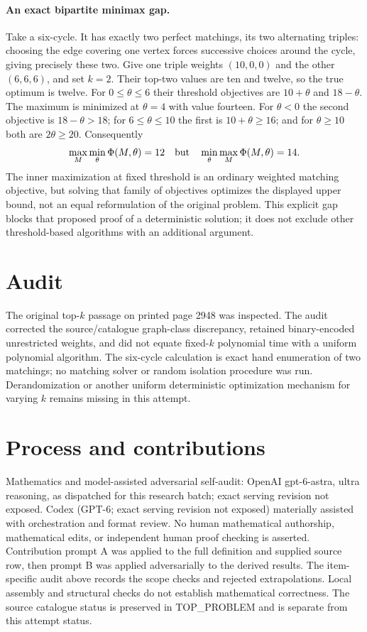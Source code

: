 \documentclass[11pt]{article}
\begin{document}
\paragraph{An exact bipartite minimax gap.}
Take a six-cycle. It has exactly two perfect matchings, its two
alternating triples: choosing the edge covering one vertex forces
successive choices around the cycle, giving precisely these two.
Give one triple weights $(10,0,0)$ and the other $(6,6,6)$,
and set $k=2$. Their top-two values are ten and twelve, so
the true optimum is twelve. For $0\le\theta\le6$ their
threshold objectives are $10+\theta$ and $18-\theta$.
The maximum is minimized at $\theta=4$ with value fourteen.
For $\theta<0$ the second objective is $18-\theta>18$;
for $6\le\theta\le10$ the first is $10+\theta\ge16$;
and for $\theta\ge10$ both are $2\theta\ge20$.
Consequently
\[
\max_M\min_\theta\Phi(M,\theta)=12
\quad\hbox{but}\quad
\min_\theta\max_M\Phi(M,\theta)=14.
\]
The inner maximization at fixed threshold is an ordinary weighted
matching objective, but solving that family of objectives optimizes
the displayed upper bound, not an equal reformulation of the
original problem. This explicit gap blocks that proposed proof of
a deterministic solution; it does not exclude other threshold-based
algorithms with an additional argument.

\section{Audit}
The original top-$k$ passage on printed page 2948 was inspected.
The audit corrected the source/catalogue graph-class discrepancy,
retained binary-encoded unrestricted weights, and did not equate
fixed-$k$ polynomial time with a uniform polynomial algorithm.
The six-cycle calculation is exact hand enumeration of two matchings;
no matching solver or random isolation procedure was run.
Derandomization or another uniform deterministic optimization mechanism
for varying $k$ remains missing in this attempt.

\section{Process and contributions}
Mathematics and model-assisted adversarial self-audit: OpenAI gpt-6-astra, ultra reasoning, as dispatched for this research batch; exact serving revision not exposed. Codex (GPT-6; exact serving revision not exposed) materially assisted with orchestration and format review. No human mathematical authorship, mathematical edits, or independent human proof checking is asserted.
Contribution prompt A was applied to the full definition and supplied source row, then prompt B was applied adversarially to the derived results. The item-specific audit above records the scope checks and rejected extrapolations. Local assembly and structural checks do not establish mathematical correctness. The source catalogue status is preserved in TOP\_PROBLEM and is separate from this attempt status.
\end{document}

